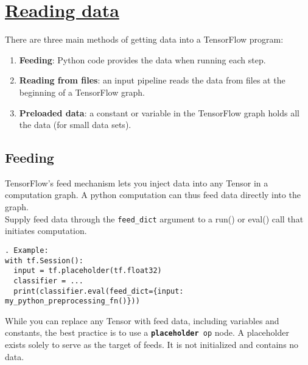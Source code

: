 \documentclass[11pt,a4paper]{article}
\begin{document}
\section{\href{www.tensorflow.org/versions/r0.11/how_tos/reading_data/index.html}{Reading data}}
There are three main methods of getting data into a TensorFlow program: 
\begin{enumerate}
	\item \textbf{Feeding}: Python code provides the data when running each step. 
	\item \textbf{Reading from files}: an input pipeline reads the data from files at the beginning of a TensorFlow graph. 
	\item \textbf{Preloaded data}: a constant or variable in the TensorFlow graph holds all the data (for small data sets). 
\end{enumerate}
\subsection{Feeding}
TensorFlow's feed mechanism lets you inject data into any Tensor in a computation graph. A python computation can thus feed data directly into the graph.\\
Supply feed data through the \texttt{feed\_dict} argument to a run() or eval() call that initiates computation.
\begin{lstlisting}. Example: 
with tf.Session():
  input = tf.placeholder(tf.float32)
  classifier = ...
  print(classifier.eval(feed_dict={input: my_python_preprocessing_fn()}))
  \end{lstlisting}

While you can replace any Tensor with feed data, including variables and constants, the best practice is to use a \texttt{\textbf{placeholder} op}  node. A placeholder exists solely to serve as the target of feeds. It is not initialized and contains no data.
\end{document}
